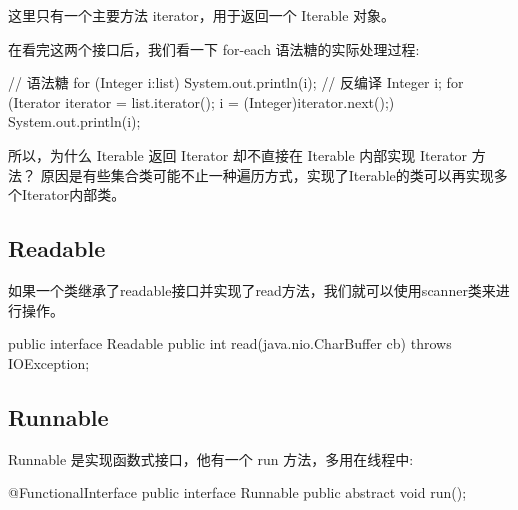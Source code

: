 这里只有一个主要方法 iterator，用于返回一个 Iterable 对象。

在看完这两个接口后，我们看一下 for-each 语法糖的实际处理过程:

\begin{Java}
// 语法糖
for (Integer i:list) {
    System.out.println(i);
}
// 反编译
Integer i;
for (Iterator iterator = list.iterator(); i = (Integer)iterator.next();) {
    System.out.println(i);
}
\end{Java}

所以，为什么 Iterable 返回 Iterator 却不直接在 Iterable 内部实现 Iterator 方法？ 原因是有些集合类可能不止一种遍历方式，实现了Iterable的类可以再实现多个Iterator内部类。

\subsection{Readable}

如果一个类继承了readable接口并实现了read方法，我们就可以使用scanner类来进行操作。

\begin{Java}
public interface Readable {
    public int read(java.nio.CharBuffer cb) throws IOException;
}
\end{Java}

\subsection{Runnable}

Runnable 是实现函数式接口，他有一个 run 方法，多用在线程中:

\begin{Java}
@FunctionalInterface
public interface Runnable {
    public abstract void run();
}
\end{Java}

\newpage